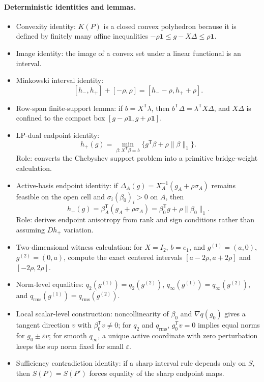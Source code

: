 \documentclass[11pt]{article}
\newcommand{\one}{\mathbf{1}}
\newcommand{\transpose}{\mathsf{T}}
\theoremstyle{definition}
\theoremstyle{plain}
\theoremstyle{remark}
\begin{document}
\paragraph{Deterministic identities and lemmas.}
\begin{itemize}[leftmargin=*]
\item Convexity identity: \(K(P)\) is a closed convex polyhedron because it is
defined by finitely many affine inequalities
\(-\rho\one\le g-X\Delta\le\rho\one\).
\item Image identity: the image of a convex set under a linear functional is an
interval.
\item Minkowski interval identity:
\[
[h_-,h_+]+[-\rho,\rho]=[h_--\rho,h_++\rho].
\]
\item Row-span finite-support lemma: if \(b=X^\transpose\lambda\), then
\(b^\transpose\Delta=\lambda^\transpose X\Delta\), and \(X\Delta\) is confined
to the compact box \([g-\rho\one,g+\rho\one]\).
\item LP-dual endpoint identity:
\[
h_+(g)=\min_{\beta:X^\transpose\beta=b}
\{g^\transpose\beta+\rho\|\beta\|_1\}.
\]
Role: converts the Chebyshev support problem into a primitive bridge-weight
calculation.
\item Active-basis endpoint identity: if
\(\Delta_A(g)=X_A^{-1}(g_A+\rho\sigma_A)\) remains feasible on the open cell
and \(\sigma_i(\beta_0)_i>0\) on \(A\), then
\[
h_+(g)=\beta_A^\transpose(g_A+\rho\sigma_A)
      =\beta_0^\transpose g+\rho\|\beta_0\|_1.
\]
Role: derives endpoint anisotropy from rank and sign conditions rather than
assuming \(Dh_+\) variation.
\item Two-dimensional witness calculation: for \(X=I_2\), \(b=e_1\), and
\(g^{(1)}=(a,0)\), \(g^{(2)}=(0,a)\), compute the exact centered intervals
\([a-2\rho,a+2\rho]\) and \([-2\rho,2\rho]\).
\item Norm-level equalities: \(q_2(g^{(1)})=q_2(g^{(2)})\),
\(q_\infty(g^{(1)})=q_\infty(g^{(2)})\), and
\(q_{\mathrm{rms}}(g^{(1)})=q_{\mathrm{rms}}(g^{(2)})\).
\item Local scalar-level construction: noncollinearity of \(\beta_0\) and
\(\nabla q(g_0)\) gives a tangent direction \(v\) with
\(\beta_0^\transpose v\ne0\); for \(q_2\) and \(q_{\mathrm{rms}}\),
\(g_0^\transpose v=0\) implies equal norms for \(g_0\pm\varepsilon v\); for
smooth \(q_\infty\), a unique active coordinate with zero perturbation keeps
the sup norm fixed for small \(\varepsilon\).
\item Sufficiency contradiction identity: if a sharp interval rule depends only
on \(S\), then \(S(P)=S(P')\) forces equality of the sharp endpoint maps.
\end{itemize}
\end{document}
